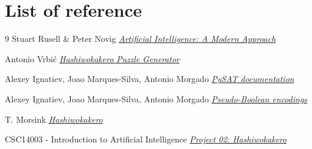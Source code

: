 \section{List of reference}

\begin{thebibliography}{9}
Stuart Rusell \& Peter Novig 
\emph{\href{https://drive.google.com/drive/folders/16awghF-bo4h66hyvAn6CcM7t2FeS_DJo}{Artificial Intelligence: A Modern Approach}}

Antonio Vrbić
\emph{\href{https://hashi-puzzles.com/generator}{Hashiwokakero Puzzle Generator}}

Alexey Ignatiev, Joao Marques-Silva, Antonio Morgado
\emph{\href{https://pysathq.github.io/docs/pysat.pdf}{PySAT documentation}}

Alexey Ignatiev, Joao Marques-Silva, Antonio Morgado
\emph{\href{https://pysathq.github.io/docs/html/api/pb.html}{Pseudo-Boolean encodings}}

T. Morsink
\emph{\href{https://theses.liacs.nl/pdf/2009-11TimoMorsink.pdf}{Hashiwokakero}}

CSC14003 - Introduction to Artificial Intelligence
\emph{\href{https://drive.google.com/drive/folders/1VP8CAJl8wAZw6Yo_AoGdu-l4O0LVzH3-}{Project 02: Hashiwokakero}}

\end{thebibliography}

